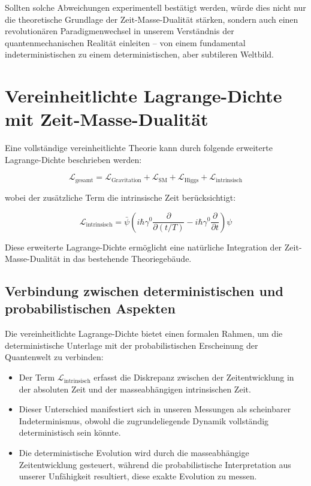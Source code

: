 \documentclass[12pt,a4paper]{article}  %
\begin{document}
		Sollten solche Abweichungen experimentell bestätigt werden, würde dies nicht nur die theoretische Grundlage der Zeit-Masse-Dualität stärken, sondern auch einen revolutionären Paradigmenwechsel in unserem Verständnis der quantenmechanischen Realität einleiten – von einem fundamental indeterministischen zu einem deterministischen, aber subtileren Weltbild.
		
		\section{Vereinheitlichte Lagrange-Dichte mit Zeit-Masse-Dualität}
		
		Eine vollständige vereinheitlichte Theorie kann durch folgende erweiterte Lagrange-Dichte beschrieben werden:
		
		\begin{equation}
		\mathcal{L}_\text{gesamt} = \mathcal{L}_\text{Gravitation} + \mathcal{L}_\text{SM} + \mathcal{L}_\text{Higgs} + \mathcal{L}_\text{intrinsisch}
		\end{equation}
		
		wobei der zusätzliche Term die intrinsische Zeit berücksichtigt:
		
		\begin{equation}
		\mathcal{L}_\text{intrinsisch} = \bar{\psi}\left(i\hbar\gamma^0 \frac{\partial}{\partial (t/T)} - i\hbar\gamma^0 \frac{\partial}{\partial t}\right)\psi
		\end{equation}
		
		Diese erweiterte Lagrange-Dichte ermöglicht eine natürliche Integration der Zeit-Masse-Dualität in das bestehende Theoriegebäude.
		
		\subsection{Verbindung zwischen deterministischen und probabilistischen Aspekten}
		
		Die vereinheitlichte Lagrange-Dichte bietet einen formalen Rahmen, um die deterministische Unterlage mit der probabilistischen Erscheinung der Quantenwelt zu verbinden:
		
		\begin{itemize}
		\item Der Term $\mathcal{L}_\text{intrinsisch}$ erfasst die Diskrepanz zwischen der Zeitentwicklung in der absoluten Zeit und der masseabhängigen intrinsischen Zeit.
		
		\item Dieser Unterschied manifestiert sich in unseren Messungen als scheinbarer Indeterminismus, obwohl die zugrundeliegende Dynamik vollständig deterministisch sein könnte.
		
		\item Die deterministische Evolution wird durch die masseabhängige Zeitentwicklung gesteuert, während die probabilistische Interpretation aus unserer Unfähigkeit resultiert, diese exakte Evolution zu messen.
		\end{itemize}
		
\end{document}
